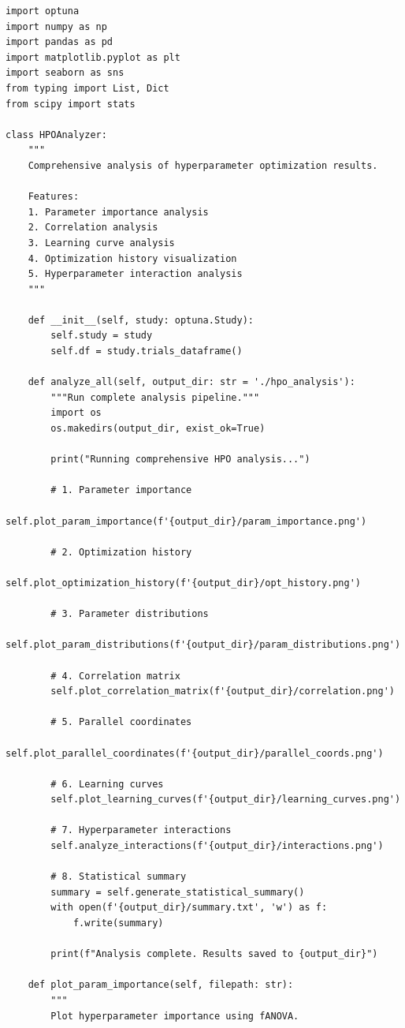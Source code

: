 \begin{lstlisting}[style=python, caption=Comprehensive HPO analysis and visualization]
import optuna
import numpy as np
import pandas as pd
import matplotlib.pyplot as plt
import seaborn as sns
from typing import List, Dict
from scipy import stats

class HPOAnalyzer:
    """
    Comprehensive analysis of hyperparameter optimization results.

    Features:
    1. Parameter importance analysis
    2. Correlation analysis
    3. Learning curve analysis
    4. Optimization history visualization
    5. Hyperparameter interaction analysis
    """

    def __init__(self, study: optuna.Study):
        self.study = study
        self.df = study.trials_dataframe()

    def analyze_all(self, output_dir: str = './hpo_analysis'):
        """Run complete analysis pipeline."""
        import os
        os.makedirs(output_dir, exist_ok=True)

        print("Running comprehensive HPO analysis...")

        # 1. Parameter importance
        self.plot_param_importance(f'{output_dir}/param_importance.png')

        # 2. Optimization history
        self.plot_optimization_history(f'{output_dir}/opt_history.png')

        # 3. Parameter distributions
        self.plot_param_distributions(f'{output_dir}/param_distributions.png')

        # 4. Correlation matrix
        self.plot_correlation_matrix(f'{output_dir}/correlation.png')

        # 5. Parallel coordinates
        self.plot_parallel_coordinates(f'{output_dir}/parallel_coords.png')

        # 6. Learning curves
        self.plot_learning_curves(f'{output_dir}/learning_curves.png')

        # 7. Hyperparameter interactions
        self.analyze_interactions(f'{output_dir}/interactions.png')

        # 8. Statistical summary
        summary = self.generate_statistical_summary()
        with open(f'{output_dir}/summary.txt', 'w') as f:
            f.write(summary)

        print(f"Analysis complete. Results saved to {output_dir}")

    def plot_param_importance(self, filepath: str):
        """
        Plot hyperparameter importance using fANOVA.


\end{lstlisting}
